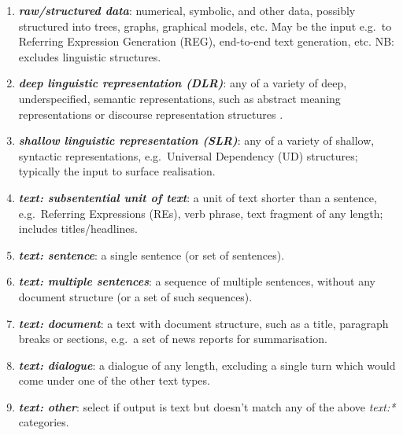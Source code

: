 \documentclass[11pt,a4paper]{article}
\newcommand{\egcvalue}[1]{\textbf{\textit{#1}}}
\begin{document}
\begin{enumerate}[itemsep=0cm,leftmargin=0.5cm,label={\small $\square$}]
            \item \egcvalue{raw/structured data}: numerical, symbolic, and other data, possibly structured into trees, graphs, graphical models, etc. May be the input e.g.\ to Referring Expression Generation (REG), end-to-end text generation, etc. {NB}: excludes linguistic structures.
            
            \item \egcvalue{deep linguistic representation (DLR)}: any of a variety of deep, underspecified, semantic representations, such as abstract meaning representations \citep[AMRs;][]{banarescu-etal-2013-abstract} or discourse representation structures \citep[DRSs;][]{kamp-reyle2013discourse}.
            
            \item \egcvalue{shallow linguistic representation (SLR)}: any of a variety of shallow, syntactic representations, e.g.\ Universal Dependency (UD) structures; typically the input to surface realisation.
            
            \item \egcvalue{text: subsentential unit of text}: a unit of text shorter than a sentence, e.g.\ Referring Expressions (REs), verb phrase, text fragment of any length; includes titles/headlines.
            
            \item \egcvalue{text: sentence}: a single sentence (or set of sentences).
            
            \item \egcvalue{text: multiple sentences}: a sequence of multiple sentences, without any document structure (or a set of such sequences). 
            
            \item \egcvalue{text: document}: a text with document structure, such as a title, paragraph breaks or sections, e.g.\ a set of news reports for summarisation.
            
            \item \egcvalue{text: dialogue}: a dialogue of any length, excluding a single turn which would come under one of the other text types.
            
           \item \egcvalue{text: other}: select if output is text but doesn't match any of the above \textit{text:*} categories.
            

\end{enumerate}
\end{document}
